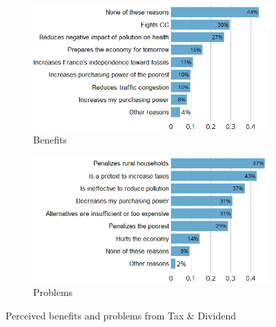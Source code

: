 \documentclass[english,5p,authoryear]{elsarticle}
\begin{document}

\begin{figure}[t]
\centering
\begin{subfigure}[b]{\columnwidth}
   \caption{Benefits}
   \includegraphics[width=\columnwidth]{Images/CC_benefits_synchro.png}
\end{subfigure}

\begin{subfigure}[b]{\columnwidth}
\vspace{0.3cm}
   \caption{Problems}
   \includegraphics[width=\columnwidth]{Images/CC_problems_synchro.png}
\end{subfigure}
\caption{Perceived benefits and problems from Tax \& Dividend}
   \label{fig:benefits_problems}
\end{figure}
\end{document}
